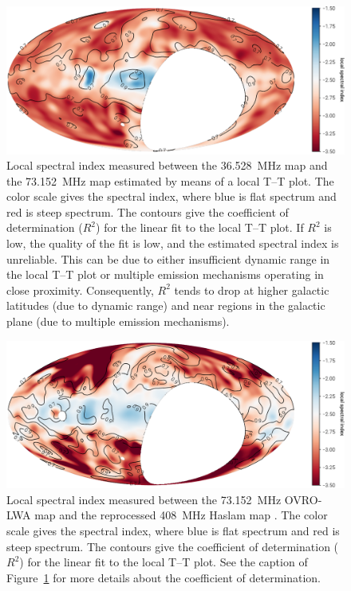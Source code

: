 \begin{bibunit}
\begin{figure}[t]
    \centering
    \includegraphics[width=\textwidth]{figures/chapter3/better-internal-spectral-index}
    \caption{
        Local spectral index measured between the 36.528~MHz map and the 73.152~MHz map estimated by
        means of a local T--T plot. The color scale gives the spectral index, where blue is flat
        spectrum and red is steep spectrum. The contours give the coefficient of determination
        ($R^2$) for the linear fit to the local T--T plot. If $R^2$ is low, the quality of the fit
        is low, and the estimated spectral index is unreliable. This can be due to either
        insufficient dynamic range in the local T--T plot or multiple emission mechanisms operating
        in close proximity. Consequently, $R^2$ tends to drop at higher galactic latitudes (due to
        dynamic range) and near  regions in the galactic plane (due to multiple emission
        mechanisms).
    }
    \label{fig:internal-spectral-index}
\end{figure}

\begin{figure}[t]
    \centering
    \includegraphics[width=\textwidth]{figures/chapter3/better-haslam-spectral-index}
    \caption{
        Local spectral index measured between the 73.152~MHz OVRO-LWA map and the reprocessed
        408~MHz Haslam map \citep{2015MNRAS.451.4311R}.  The color scale gives the spectral index,
        where blue is flat spectrum and red is steep spectrum. The contours give the coefficient of
        determination ($R^2$) for the linear fit to the local T--T plot. See the caption of
        Figure~\ref{fig:internal-spectral-index} for more details about the coefficient of
        determination.
    }
    \label{fig:haslam-spectral-index}
\end{figure}


\end{bibunit}
